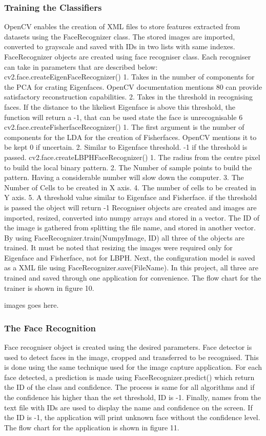 \documentclass[11pt]{article}
\begin{document}
\subsubsection{Training the Classifiers}
OpenCV enables the creation of XML files to store features extracted from datasets using the FaceRecognizer class. The stored images are imported, converted to grayscale and saved with IDs in two lists
with same indexes. FaceRecognizer objects are created using face recogniser class. Each recogniser can
take in parameters that are described below:
cv2.face.createEigenFaceRecognizer()
1. Takes in the number of components for the PCA for crating Eigenfaces. OpenCV documentation
mentions 80 can provide satisfactory reconstruction capabilities.
2. Takes in the threshold in recognising faces. If the distance to the likeliest Eigenface is above this
threshold, the function will return a -1, that can be used state the face is unrecognisable
6
cv2.face.createFisherfaceRecognizer()
1. The first argument is the number of components for the LDA for the creation of Fisherfaces.
OpenCV mentions it to be kept 0 if uncertain.
2. Similar to Eigenface threshold. -1 if the threshold is passed.
cv2.face.createLBPHFaceRecognizer()
1. The radius from the centre pixel to build the local binary pattern.
2. The Number of sample points to build the pattern. Having a considerable number will slow down
the computer.
3. The Number of Cells to be created in X axis.
4. The number of cells to be created in Y axis.
5. A threshold value similar to Eigenface and Fisherface. if the threshold is passed the object will
return -1
Recogniser objects are created and images are imported, resized, converted into numpy arrays and stored
in a vector. The ID of the image is gathered from splitting the file name, and stored in another vector.
By using FaceRecognizer.train(NumpyImage, ID) all three of the objects are trained. It must be
noted that resizing the images were required only for Eigenface and Fisherface, not for LBPH. Next, the
configuration model is saved as a XML file using FaceRecognizer.save(FileName). In this project,
all three are trained and saved through one application for convenience. The flow chart for the trainer is
shown in figure 10.

images goes here.

\subsubsection{The Face Recognition}
Face recogniser object is created using the desired parameters. Face detector is used to detect faces in the
image, cropped and transferred to be recognised. This is done using the same technique used for the image
capture application. For each face detected, a prediction is made using FaceRecognizer.predict() which
return the ID of the class and confidence. The process is same for all algorithms and if the confidence
his higher than the set threshold, ID is -1. Finally, names from the text file with IDs are used to display
the name and confidence on the screen. If the ID is -1, the application will print unknown face without
the confidence level. The flow chart for the application is shown in figure 11.
\end{document}

